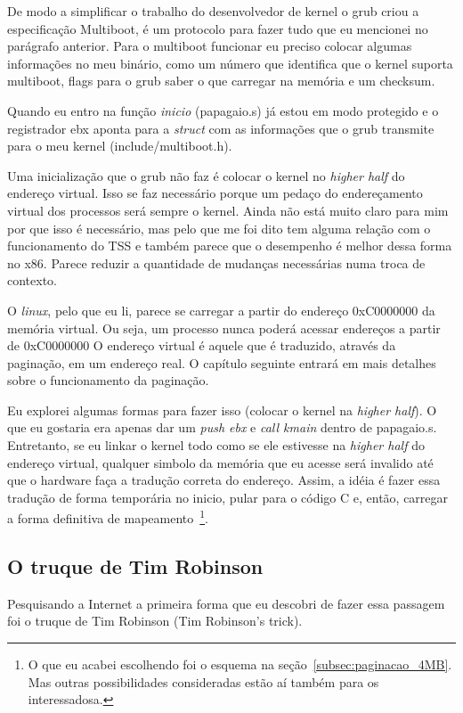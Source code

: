 \documentclass{article}
\begin{document}
De modo a simplificar o trabalho do desenvolvedor de kernel o grub criou a
especificação Multiboot, é um protocolo para fazer tudo que eu mencionei no
parágrafo anterior. Para o multiboot funcionar eu preciso colocar algumas
informações no meu binário, como um número que identifica que o kernel suporta
multiboot, flags para o grub saber o que carregar na memória e um checksum.

Quando eu entro na função \emph{inicio} (papagaio.s) já estou em modo protegido
e o registrador ebx aponta para a \emph{struct} com as informações que o grub
transmite para o meu kernel (include/multiboot.h).

Uma inicialização que o grub não faz é colocar o kernel no \emph{higher half} do
endereço virtual. Isso se faz necessário porque um pedaço do endereçamento
virtual dos processos será sempre o kernel. Ainda não está muito claro para mim por
que isso é necessário, mas pelo que me foi dito tem alguma relação com o
funcionamento do TSS e também parece que o desempenho é melhor dessa forma no
x86. Parece reduzir a quantidade de mudanças necessárias numa troca de contexto.

O \emph{linux}, pelo que eu li, parece se carregar a partir do endereço
0xC0000000 da memória virtual. Ou seja, um processo nunca poderá acessar
endereços a partir de 0xC0000000 O endereço virtual é aquele que é traduzido,
através da paginação, em um endereço real. O capítulo seguinte entrará em mais
detalhes sobre o funcionamento da paginação.

Eu explorei algumas formas para fazer isso (colocar o kernel na \emph{higher
half}). O que eu gostaria era apenas dar um \emph{push ebx} e \emph{call kmain}
dentro de papagaio.s. Entretanto, se eu linkar o kernel todo como se
ele estivesse na \emph{higher half} do endereço virtual, qualquer simbolo da
memória que eu acesse será invalido até que o hardware faça a tradução correta
do endereço. Assim, a idéia é fazer essa tradução de forma temporária no inicio,
pular para o código C e, então, carregar a forma definitiva de
mapeamento~\footnote{O que eu acabei escolhendo foi o esquema na
seção~\ref{subsec:paginacao_4MB}.  Mas outras possibilidades consideradas estão
aí também para os interessadosa.}.

\subsection{O truque de Tim Robinson}
Pesquisando a Internet a primeira forma que eu descobri de fazer essa passagem
foi o truque de Tim Robinson (Tim Robinson's trick).
\end{document}
